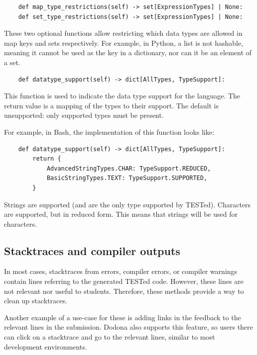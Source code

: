 \documentclass[../main]{subfiles}
\begin{document}
\begin{verbatim}
    def map_type_restrictions(self) -> set[ExpressionTypes] | None:
    def set_type_restrictions(self) -> set[ExpressionTypes] | None:
\end{verbatim}

These two optional functions allow restricting which data types are allowed in map keys and sets respectively.
For example, in Python, a list is not hashable, meaning it cannot be used as the key in a dictionary, nor can it be an element of a set.

\begin{verbatim}
    def datatype_support(self) -> dict[AllTypes, TypeSupport]:
\end{verbatim}

This function is used to indicate the data type support for the language.
The return value is a mapping of the types to their support.
The default is unsupported: only supported types must be present.

For example, in Bash, the implementation of this function looks like:

\begin{verbatim}
    def datatype_support(self) -> dict[AllTypes, TypeSupport]:
        return {
            AdvancedStringTypes.CHAR: TypeSupport.REDUCED,
            BasicStringTypes.TEXT: TypeSupport.SUPPORTED,
        }
\end{verbatim}

Strings are supported (and are the only type supported by TESTed).
Characters are supported, but in reduced form.
This means that strings will be used for characters.

\subsection{Stacktraces and compiler outputs}\label{subsec:error-messages-and-compiler-outputs}

In most cases, stacktraces from errors, compiler errors, or compiler warnings contain lines referring to the generated TESTed code.
However, these lines are not relevant nor useful to students.
Therefore, these methods provide a way to clean up stacktraces.

Another example of a use-case for these is adding links in the feedback to the relevant lines in the submission.
Dodona also supports this feature, so users there can click on a stacktrace and go to the relevant lines, similar to most development environments.
\end{document}
